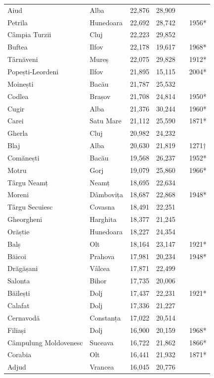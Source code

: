 \documentclass{article}
\begin{document}
\begin{tabular}{llllll}
Aiud & Alba & 22,876 & 28,909 &  &  \\
Petrila & Hunedoara & 22,692 & 28,742 &  & 1956* \\
Câmpia Turzii & Cluj & 22,223 & 29,852 &  &  \\
Buftea & Ilfov & 22,178 & 19,617 &  & 1968* \\
Târnăveni & Mureș & 22,075 & 29,828 &  & 1912* \\
Popești-Leordeni & Ilfov & 21,895 & 15,115 &  & 2004* \\
Moinești & Bacău & 21,787 & 25,532 &  &  \\
Codlea & Brașov & 21,708 & 24,814 &  & 1950* \\
Cugir & Alba & 21,376 & 30,244 &  & 1960* \\
Carei & Satu Mare & 21,112 & 25,590 &  & 1871* \\
Gherla & Cluj & 20,982 & 24,232 &  &  \\
Blaj & Alba & 20,630 & 21,819 &  & 1271† \\
Comănești & Bacău & 19,568 & 26,237 &  & 1952* \\
Motru & Gorj & 19,079 & 25,860 &  & 1966* \\
Târgu Neamț & Neamț & 18,695 & 22,634 &  &  \\
Moreni & Dâmbovița & 18,687 & 22,868 &  & 1948* \\
Târgu Secuiesc & Covasna & 18,491 & 22,251 &  &  \\
Gheorgheni & Harghita & 18,377 & 21,245 &  &  \\
Orăștie & Hunedoara & 18,227 & 24,354 &  &  \\
Balș & Olt & 18,164 & 23,147 &  & 1921* \\
Băicoi & Prahova & 17,981 & 20,234 &  & 1948* \\
Drăgășani & Vâlcea & 17,871 & 22,499 &  &  \\
Salonta & Bihor & 17,735 & 20,006 &  &  \\
Băilești & Dolj & 17,437 & 22,231 &  & 1921* \\
Calafat & Dolj & 17,336 & 21,227 &  &  \\
Cernavodă & Constanța & 17,022 & 20,514 &  &  \\
Filiași & Dolj & 16,900 & 20,159 &  & 1968* \\
Câmpulung Moldovenesc & Suceava & 16,722 & 21,862 &  & 1866* \\
Corabia & Olt & 16,441 & 21,932 &  & 1871* \\
Adjud & Vrancea & 16,045 & 20,776 &  &  \\

\end{tabular}
\end{document}
